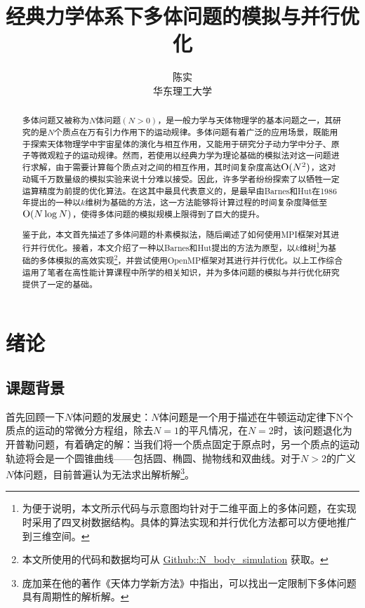 \documentclass[lang=cn,11pt,a4paper,cite=authoryear]{elegantpaper}
\title{经典力学体系下多体问题的模拟与并行优化}
\author{陈实 \\ 华东理工大学}
\date{\zhtoday}
\begin{document}
% 

\maketitle

\begin{abstract}

多体问题又被称为$N$体问题$(N>0)$，是一般力学与天体物理学的基本问题之一，其研究的是$N$个质点在万有引力作用下的运动规律。多体问题有着广泛的应用场景，既能用于探索天体物理学中宇宙星体的演化与相互作用，又能用于研究分子动力学中分子、原子等微观粒子的运动规律。然而，若使用以经典力学为理论基础的模拟法对这一问题进行求解，由于需要计算每个质点对之间的相互作用，其时间复杂度高达$\text O(N^2)$，这对动辄千万数量级的模拟实验来说十分难以接受。因此，许多学者纷纷探索了以牺牲一定运算精度为前提的优化算法。在这其中最具代表意义的，是最早由Barnes和Hut在1986年提出的一种以$k$维树为基础的方法，这一方法能够将计算过程的时间复杂度降低至$\text O(N\log N)$，使得多体问题的模拟规模上限得到了巨大的提升。

鉴于此，本文首先描述了多体问题的朴素模拟法，随后阐述了如何使用MPI框架对其进行并行优化。接着，本文介绍了一种以Barnes和Hut提出的方法为原型，以$k$维树\footnote{为便于说明，本文所示代码与示意图均针对于二维平面上的多体问题，在实现时采用了四叉树数据结构。具体的算法实现和并行优化方法都可以方便地推广到三维空间。}为基础的多体模拟的高效实现\footnote{本文所使用的代码和数据均可从 \href{https://github.com/PHIKN1GHT/n_body_simulation}{Github::N\_body\_simulation} 获取。}，并尝试使用OpenMP框架对其进行并行优化。以上工作综合运用了笔者在高性能计算课程中所学的相关知识，并为多体问题的模拟与并行优化研究提供了一定的基础。

\end{abstract}

\newpage

\section{绪论}

\subsection{课题背景}

首先回顾一下$N$体问题的发展史：$N$体问题是一个用于描述在牛顿运动定律下N个质点的运动的常微分方程组，除去$N=1$的平凡情况，在$N=2$时，该问题退化为开普勒问题，有着确定的解：当我们将一个质点固定于原点时，另一个质点的运动轨迹将会是一个圆锥曲线——包括圆、椭圆、抛物线和双曲线。对于$N>2$的广义$N$体问题，目前普遍认为无法求出解析解\footnote{庞加莱在他的著作《天体力学新方法》中指出，可以找出一定限制下多体问题具有周期性的解析解。}。
\end{document}
